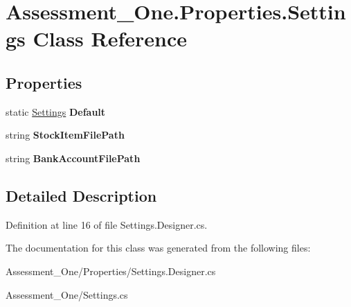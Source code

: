 \hypertarget{class_assessment___one_1_1_properties_1_1_settings}{
\section{Assessment\_\-One.Properties.Settings Class Reference}
\label{class_assessment___one_1_1_properties_1_1_settings}
}
\subsection*{Properties}
\begin{DoxyCompactItemize}
\item 
\hypertarget{class_assessment___one_1_1_properties_1_1_settings_aa5807357c6123fe0c9568ea00d25b2f1}{
static \hyperlink{class_assessment___one_1_1_properties_1_1_settings}{Settings} {\bfseries Default}}
\label{class_assessment___one_1_1_properties_1_1_settings_aa5807357c6123fe0c9568ea00d25b2f1}

\item 
\hypertarget{class_assessment___one_1_1_properties_1_1_settings_a3e1379808cb07f22360fb4e9d307bbf6}{
string {\bfseries StockItemFilePath}}
\label{class_assessment___one_1_1_properties_1_1_settings_a3e1379808cb07f22360fb4e9d307bbf6}

\item 
\hypertarget{class_assessment___one_1_1_properties_1_1_settings_a90a2e4214be94717436ef0ede040128a}{
string {\bfseries BankAccountFilePath}}
\label{class_assessment___one_1_1_properties_1_1_settings_a90a2e4214be94717436ef0ede040128a}

\end{DoxyCompactItemize}


\subsection{Detailed Description}


Definition at line 16 of file Settings.Designer.cs.



The documentation for this class was generated from the following files:\begin{DoxyCompactItemize}
\item 
Assessment\_\-One/Properties/Settings.Designer.cs\item 
Assessment\_\-One/Settings.cs\end{DoxyCompactItemize}
